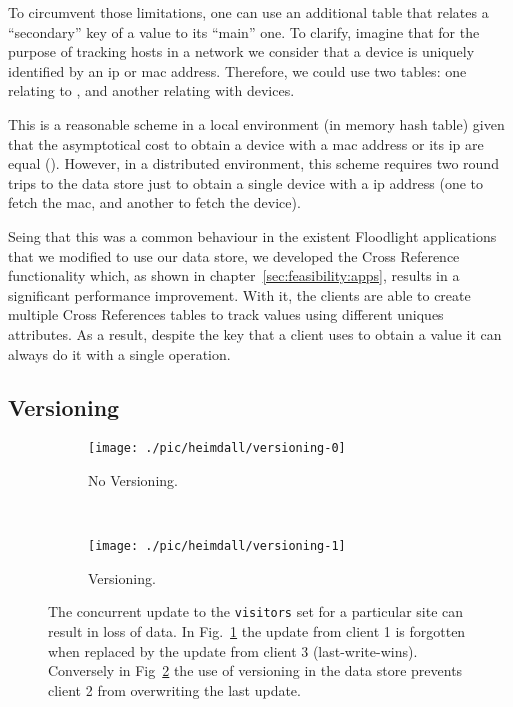 To circumvent those limitations, one can use an additional table that relates a ``secondary'' key of a value to its ``main'' one. 
To clarify, imagine that for the purpose of tracking hosts in a network we consider that a device is uniquely identified by an \gls{ip} or \gls{mac} address. 
Therefore, we could use two tables: one relating  to  , and another relating  with devices.

This is a reasonable scheme in a local environment (in memory hash table) given that the asymptotical cost to obtain a device with 
a \gls{mac} address or its \gls{ip}  are equal (). 
However, in a distributed environment, this scheme requires two round trips to the data store just to obtain a single device with a \gls{ip} address (one to fetch the \gls{mac}, and another to fetch the device). 

Seing that this was a common behaviour in the existent Floodlight applications that we modified to use our data store, we developed the Cross Reference functionality which, as shown in chapter~\ref{sec:feasibility:apps}, results in a significant performance improvement. 
With it, the clients are able to create multiple Cross References tables to track values using different uniques attributes. 
As a result, despite the key that a client uses to obtain a value it can always do it with a single operation. 

\subsection {Versioning}
\label{sec:heimdall:versioning}
\begin{figure}[ht]
  \centering
  \begin{subfigure}[b]{0.5\textwidth}
                \centering
                \texttt{[image: ./pic/heimdall/versioning-0]}
                \caption{No Versioning.} 
                \label{fig:heimdall:versioning-0}

        \end{subfigure}
        ~
        \begin{subfigure}[b]{0.5\textwidth}
                \centering
                \texttt{[image: ./pic/heimdall/versioning-1]}
                \caption{Versioning.}
                \label{fig:heimdall:versioning-1}
        \end{subfigure}
  \caption[Concurrent updates]{The concurrent update to the \texttt{visitors} set for a particular site can result in loss of data. In  Fig.~\ref{fig:heimdall:versioning-0} the update from client 1 is forgotten  when replaced by the update from client 3 (last-write-wins).  Conversely in Fig~\ref{fig:heimdall:versioning-1} the use of versioning in the data store prevents client 2 from overwriting the last update.}
\label{fig:heimdall:versioning}
\end{figure}

